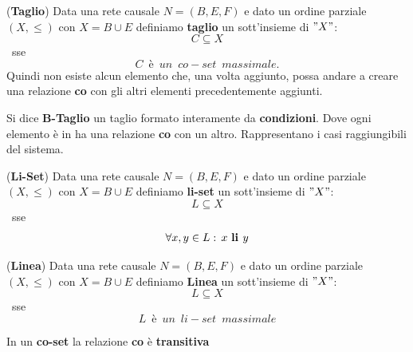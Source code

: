 \begin{definizione}(\textbf{Taglio})
 Data una rete causale $N=(B, E, F)$ e dato un ordine parziale $(X, \leq)$ con
  $X=B\cup E$ definiamo \textbf{taglio} un sott'insieme di $"X"$:
        \[C\subseteq X\]\mbox{ sse }\[C\,\,\,è\,\,\,un\,\,\,co-set\,\,\,massimale.\] Quindi non esiste alcun elemento che, una volta aggiunto, possa andare a creare una relazione \textbf{co} con gli altri elementi precedentemente aggiunti.
        \begin{corollario}
         Si dice \textbf{B-Taglio} un taglio formato interamente da \textbf{condizioni}. Dove ogni elemento è in ha una relazione \textbf{co} con un altro. Rappresentano i casi raggiungibili del sistema.
        \end{corollario}
 \end{definizione} \vspace{5mm} %
 \begin{definizione}(\textbf{Li-Set})
 Data una rete causale $N=(B, E, F)$ e dato un ordine parziale $(X, \leq)$ con
  $X=B\cup E$ definiamo \textbf{li-set} un sott'insieme di $"X"$:
        \[L\subseteq X\]\mbox{ sse }\[ \forall x, y\in L:\, x\mbox{ \textbf{li }}y\]
\end{definizione} \vspace{5mm} %
 \begin{definizione}(\textbf{Linea})
 Data una rete causale $N=(B, E, F)$ e dato un ordine parziale $(X, \leq)$ con
  $X=B\cup E$ definiamo \textbf{Linea} un sott'insieme di $"X"$:
        \[L\subseteq X\]\mbox{ sse }\[ L\,\,\,è\,\,\, un\,\,\, li-set\,\,\, massimale\]
\end{definizione} \vspace{5mm} %
\begin{nota}
In un \textbf{co-set} la relazione \textbf{co} è \textbf{transitiva}
\end{nota}

